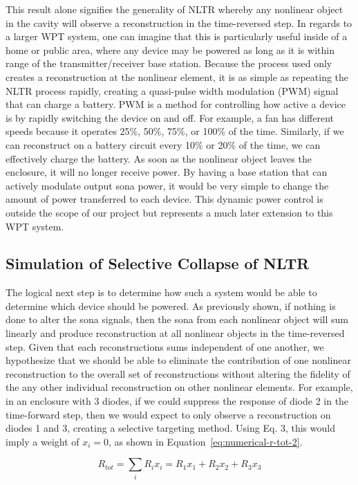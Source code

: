 This result alone signifies the generality of NLTR whereby any nonlinear object in the cavity will observe a reconstruction in the time-reversed step. In regards to a larger WPT system, one can imagine that this is particularly useful inside of a home or public area, where any device may be powered as long as it is within range of the transmitter/receiver base station. Because the process used only creates a reconstruction at the nonlinear element, it is as simple as repeating the NLTR process rapidly, creating a quasi-pulse width modulation (PWM) signal that can charge a battery. PWM is a method for controlling how active a device is by rapidly switching the device on and off. For example, a fan has different speeds because it operates 25\%, 50\%, 75\%, or 100\% of the time. Similarly, if we can reconstruct on a battery circuit every 10\% or 20\% of the time, we can effectively charge the battery. As soon as the nonlinear object leaves the enclosure, it will no longer receive power. By having a base station that can actively modulate output sona power, it would be very simple to change the amount of power transferred to each device. This dynamic power control is outside the scope of our project but represents a much later extension to this WPT system.

\subsection{Simulation of Selective Collapse of NLTR}
The logical next step is to determine how such a system would be able to determine which device should be powered. As previously shown, if nothing is done to alter the sona signals, then the sona from each nonlinear object will sum linearly and produce reconstruction at all nonlinear objects in the time-reversed step. Given that each reconstructions sums independent of one another, we hypothesize that we should be able to eliminate the contribution of one nonlinear reconstruction to the overall set of reconstructions without altering the fidelity of the any other individual reconstruction on other nonlinear elements. For example, in an enclosure with 3 diodes, if we could suppress the response of diode 2 in the time-forward step, then we would expect to only observe a reconstruction on diodes 1 and 3, creating a selective targeting method. Using Eq. 3, this would imply a weight of $x_{i} = 0$, as shown in Equation~\ref{eq:numerical-r-tot-2}.

\begin{equation}
R_{tot} = \sum_{i}R_{i}x_{i} = R_{1}x_{1} + R_{2}x_{2} + R_{3}x_{3}
\label{eq:numerical-r-tot-2}
\end{equation}


